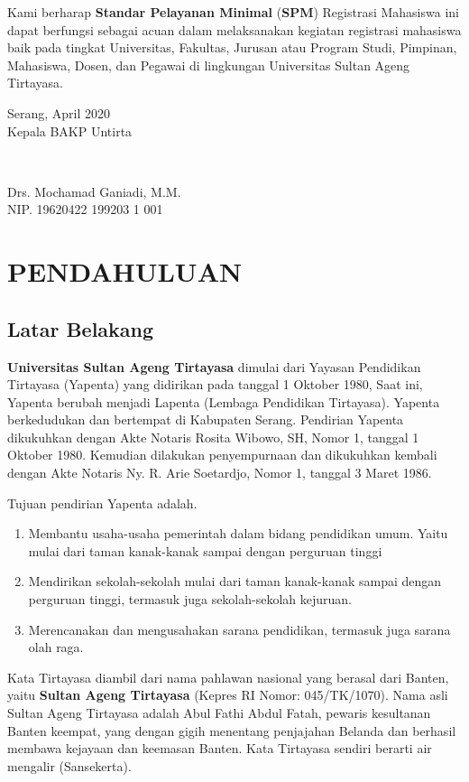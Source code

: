 \documentclass[
]{book}
\providecommand{\tightlist}{%
  \setlength{\itemsep}{0pt}\setlength{\parskip}{0pt}}
\begin{document}
Kami berharap \textbf{Standar Pelayanan Minimal} (\textbf{SPM}) Registrasi Mahasiswa ini dapat berfungsi sebagai acuan dalam melaksanakan kegiatan registrasi mahasiswa baik pada tingkat Universitas, Fakultas, Jurusan atau Program Studi, Pimpinan, Mahasiswa, Dosen, dan Pegawai di lingkungan Universitas Sultan Ageng Tirtayasa.

Serang, April 2020\\
Kepala BAKP Untirta

\(~\)

Drs. Mochamad Ganiadi, M.M.\\
NIP. 19620422 199203 1 001

\hypertarget{intro}{%
\chapter{PENDAHULUAN}\label{intro}}

\hypertarget{latar-belakang}{%
\section{Latar Belakang}\label{latar-belakang}}

\textbf{Universitas Sultan Ageng Tirtayasa} dimulai dari Yayasan Pendidikan Tirtayasa (Yapenta) yang didirikan pada tanggal 1 Oktober 1980, Saat ini, Yapenta berubah menjadi Lapenta (Lembaga Pendidikan Tirtayasa). Yapenta berkedudukan dan bertempat di Kabupaten Serang. Pendirian Yapenta dikukuhkan dengan Akte Notaris Rosita Wibowo, SH, Nomor 1, tanggal 1 Oktober 1980. Kemudian dilakukan penyempurnaan dan dikukuhkan kembali dengan Akte Notaris Ny. R. Arie Soetardjo, Nomor 1, tanggal 3 Maret 1986.

Tujuan pendirian Yapenta adalah.

\begin{enumerate}
\def\labelenumi{\arabic{enumi}.}
\tightlist
\item
  Membantu usaha-usaha pemerintah dalam bidang pendidikan umum. Yaitu mulai dari taman kanak-kanak sampai dengan perguruan tinggi
\item
  Mendirikan sekolah-sekolah mulai dari taman kanak-kanak sampai dengan perguruan tinggi, termasuk juga sekolah-sekolah kejuruan.
\item
  Merencanakan dan mengusahakan sarana pendidikan, termasuk juga sarana olah raga.
\end{enumerate}

Kata Tirtayasa diambil dari nama pahlawan nasional yang berasal dari Banten, yaitu \textbf{Sultan Ageng Tirtayasa} (Kepres RI Nomor: 045/TK/1070). Nama asli Sultan Ageng Tirtayasa adalah Abul Fathi Abdul Fatah, pewaris kesultanan Banten keempat, yang dengan gigih menentang penjajahan Belanda dan berhasil membawa kejayaan dan keemasan Banten. Kata Tirtayasa sendiri berarti air mengalir (Sansekerta).
\end{document}
